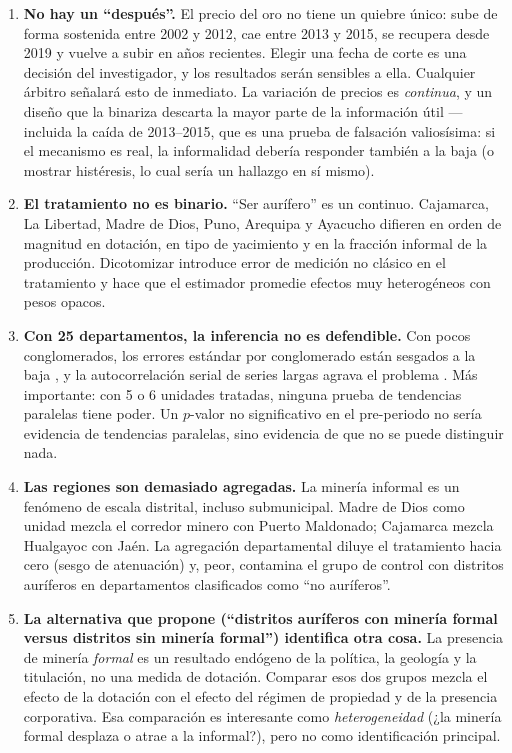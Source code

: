 \documentclass[11pt,a4paper]{article}
\begin{document}
\begin{enumerate}[leftmargin=1.6em,itemsep=3pt]
\item \textbf{No hay un ``después''.} El precio del oro no tiene un quiebre único: sube de forma sostenida entre 2002 y 2012, cae entre 2013 y 2015, se recupera desde 2019 y vuelve a subir en años recientes. Elegir una fecha de corte es una decisión del investigador, y los resultados serán sensibles a ella. Cualquier árbitro señalará esto de inmediato. La variación de precios es \emph{continua}, y un diseño que la binariza descarta la mayor parte de la información útil ---incluida la caída de 2013--2015, que es una prueba de falsación valiosísima: si el mecanismo es real, la informalidad debería responder también a la baja (o mostrar histéresis, lo cual sería un hallazgo en sí mismo).

\item \textbf{El tratamiento no es binario.} ``Ser aurífero'' es un continuo. Cajamarca, La Libertad, Madre de Dios, Puno, Arequipa y Ayacucho difieren en orden de magnitud en dotación, en tipo de yacimiento y en la fracción informal de la producción. Dicotomizar introduce error de medición no clásico en el tratamiento y hace que el estimador promedie efectos muy heterogéneos con pesos opacos.

\item \textbf{Con 25 departamentos, la inferencia no es defendible.} Con pocos conglomerados, los errores estándar por conglomerado están sesgados a la baja \citep{cameron2008}, y la autocorrelación serial de series largas agrava el problema \citep{bertrand2004}. Más importante: con 5 o 6 unidades tratadas, ninguna prueba de tendencias paralelas tiene poder. Un $p$-valor no significativo en el pre-periodo no sería evidencia de tendencias paralelas, sino evidencia de que no se puede distinguir nada.

\item \textbf{Las regiones son demasiado agregadas.} La minería informal es un fenómeno de escala distrital, incluso submunicipal. Madre de Dios como unidad mezcla el corredor minero con Puerto Maldonado; Cajamarca mezcla Hualgayoc con Jaén. La agregación departamental diluye el tratamiento hacia cero (sesgo de atenuación) y, peor, contamina el grupo de control con distritos auríferos en departamentos clasificados como ``no auríferos''.

\item \textbf{La alternativa que propone (``distritos auríferos con minería formal versus distritos sin minería formal'') identifica otra cosa.} La presencia de minería \emph{formal} es un resultado endógeno de la política, la geología y la titulación, no una medida de dotación. Comparar esos dos grupos mezcla el efecto de la dotación con el efecto del régimen de propiedad y de la presencia corporativa. Esa comparación es interesante como \emph{heterogeneidad} (¿la minería formal desplaza o atrae a la informal?), pero no como identificación principal.
\end{enumerate}
\end{document}
